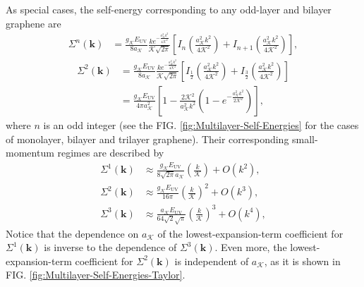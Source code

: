 \documentclass[english,aps,prd,nofootinbib,twocolumn]{revtex4-1}
\begin{document}
As special cases, the self-energy corresponding to any odd-layer and bilayer graphene are
\begin{equation}
\begin{split}
\!\!\!\!\Sigma^{n}\!(\mathbf{k })
\! &= \!
\frac{g_{\mathcal{K}}E_{\mathrm{UV}}}{8a_{\mathcal{K}}}
\frac{k e^{-\frac{a_{\mathcal{K}}^{2}k^{2}}{4\mathcal{K}^{2}}}}{\mathcal{K}\sqrt{2\pi}}
\!\!
\left[ 
\!
I_{n}\!\!
\left(\!
\frac{a_{\mathcal{K}}^{2}k^{2}}{4\mathcal{K}^{2}}
\!\right)
\!\! + \!
I_{n+1}\!\!
\left(\!
\frac{a_{\mathcal{K}}^{2}k^{2}}{4\mathcal{K}^{2}}
\!\right)
\!
\right]
\!
,
\end{split}
\end{equation}
\begin{equation}
\begin{split}
\Sigma^{2}(\mathbf{k })
\! &= \!
\frac{g_{\mathcal{K}}E_{\mathrm{UV}}}{8a_{\mathcal{K}}}
\frac{k e^{-\frac{a_{\mathcal{K}}^{2}k^{2}}{4\mathcal{K}^{2}}}}{\mathcal{K}\sqrt{2\pi}}
\!\!
\left[ 
I_{\frac{1}{2}}\!\!
\left(\!
\frac{a_{\mathcal{K}}^{2}k^{2}}{4\mathcal{K}^{2}}
\!\right)
\!\! + \!
I_{\frac{3}{2}}\!\!
\left(\!
\frac{a_{\mathcal{K}}^{2}k^{2}}{4\mathcal{K}^{2}}
\!\right)
\!
\right]
\! \\ &= \!
\frac{g_{\mathcal{K}}E_{\mathrm{UV}}}{4\pi a_{\mathcal{K}}^{2}}
\left[
1 - 
\frac{2\mathcal{K}^{2}}{a_{\mathcal{K}}^{2}k^{2}}
\left(
1-e^{-\frac{a_{\mathcal{K}}^{2}k^{2}}{2\mathcal{K}^{2}}}
\right)
\right]
\!
,
\end{split}
\end{equation}
where $n$ is an odd integer (see the FIG. \ref{fig:Multilayer-Self-Energies} for the cases of monolayer, bilayer and trilayer graphene). Their corresponding small-momentum regimes are described by
\begin{equation}
\begin{split}
\Sigma^{1}\!(\mathbf{k })
 &\approx 
\frac{g_{\mathcal{K}}E_{\mathrm{UV}}}
{8 \sqrt{2 \pi } a_{\mathcal{K}}}
\!
\left( \frac{k}{\mathcal{K}} \right)
+ O(k^{2})
, \\
\Sigma^{2}(\mathbf{k })
 &\approx 
\frac{g_{\mathcal{K}}E_{\mathrm{UV}}}
{16\pi }
\!\! 
\left( \frac{k}{\mathcal{K}} \right)^2
\!\!
+ O(k^{3})
, \\
\Sigma^{3}(\mathbf{k })
 &\approx 
\frac{a_{\mathcal{K}} E_{\mathrm{UV}}}
{64 \sqrt{2} \sqrt{\pi }}
\!\! 
\left( \frac{k}{\mathcal{K}} \right)^3
\!\!
+ O(k^{4})
,
\end{split}
\end{equation}
Notice that the dependence on $a_{\mathcal{K}}$ of the lowest-expansion-term coefficient for $\Sigma^{1}(\mathbf{k })$ is inverse to the dependence of $\Sigma^{3}(\mathbf{k })$. Even more, the lowest-expansion-term coefficient for $\Sigma^{2}(\mathbf{k })$ is independent of $a_{\mathcal{K}}$, as it is shown in FIG. \ref{fig:Multilayer-Self-Energies-Taylor}. 
\end{document}
